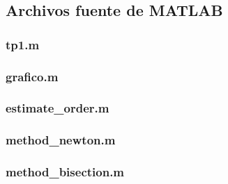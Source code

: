 \lstset{numbersep=5pt}

\lstset{inputencoding=cp1252}



\fontsize{9pt}{10pt}
\selectfont







\subsection{Archivos fuente de \textbf{MATLAB}}
\label{apendix:files}
\subsubsection{tp1.m}
\label{apendix:file_tp1}

\clearpage

\subsubsection{grafico.m}
\label{apendix:file_grafico}

\clearpage

\subsubsection{estimate\_order.m}
\label{apendix:file_estimate_order}

\clearpage

\subsubsection{method\_newton.m}
\label{apendix:file_method_newton}

\clearpage

\subsubsection{method\_bisection.m}
\label{apendix:file_method_bisection}

\clearpage


\normalfont
\normalsize







